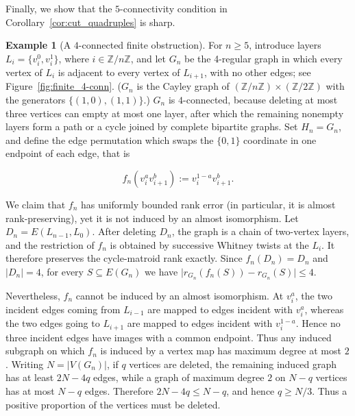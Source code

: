 \documentclass{article}
\theoremstyle{plain}
\theoremstyle{definition}
\newtheorem{ex}[thm]{Example}
\newcommand{\Z}{\mathbb{Z}}
\begin{document}
Finally, we show that the $5$-connectivity condition in Corollary~\ref{cor:cut_quadruples} is sharp.

\begin{ex}[A $4$-connected finite obstruction] \label{ex:finite_4-conn}
For \(n\geq 5\), introduce layers $L_i=\{v_i^0,v_i^1\}$, where $i\in\mathbb Z/n\mathbb Z$, and let \(G_n\) be the 4-regular graph in which every vertex of \(L_i\) is adjacent to every vertex of \(L_{i+1}\), with no other edges; see Figure~\ref{fig:finite_4-conn}. ($G_n$ is the Cayley graph of $(\Z/n\Z) \times (\Z/2\Z)$ with the generators $\{(1,0),(1,1)\}$.) $G_n$ is \(4\)-connected, because deleting at most three vertices can empty at most one layer, after which the remaining nonempty layers form a path or a cycle joined by complete bipartite graphs. Set \(H_n=G_n\), and define the edge permutation which swaps the $\{0,1\}$ coordinate in one endpoint of each edge, that is

\[
f_n(v_i^av_{i+1}^b):=v_i^{1-a}v_{i+1}^b.
\]

We claim that $f_n$ has uniformly bounded rank error (in particular, it is almost rank-preserving), yet it is not induced by an almost isomorphism. Let \(D_n=E(L_{n-1},L_0)\). After deleting \(D_n\), the graph is a chain of two-vertex layers, and the restriction of \(f_n\) is obtained by successive Whitney twists at the \(L_i\). It therefore preserves the cycle-matroid rank exactly. Since \(f_n(D_n)=D_n\) and \(|D_n|=4\), for every \(S\subseteq E(G_n)\) we have
$\bigl|r_{G_n}(f_n(S))-r_{G_n}(S)\bigr|\leq 4$. 

Nevertheless, \(f_n\) cannot be induced by an almost isomorphism. At \(v_i^a\), the two incident edges coming from \(L_{i-1}\) are mapped to edges incident with \(v_i^a\), whereas the two edges going to \(L_{i+1}\) are mapped to edges incident with \(v_i^{1-a}\). Hence no three incident edges have images with a common endpoint. Thus any induced subgraph on which \(f_n\) is induced by a vertex map has maximum degree at most \(2\). Writing $N=|V(G_n)|$, if $q$ vertices are deleted, the remaining induced graph has at least $2N-4q$ edges, while a graph of maximum degree $2$ on $N-q$ vertices has at most $N-q$ edges. Therefore $2N-4q\leq N-q$, and hence $q\geq N/3$. Thus a positive proportion of the vertices must be deleted.
\end{ex}
\end{document}
